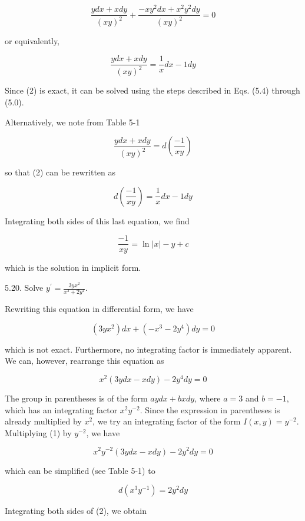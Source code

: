 \documentclass[10pt]{article}
\begin{document}
$$
\frac{y d x+x d y}{(x y)^{2}}+\frac{-x y^{2} d x+x^{2} y^{2} d y}{(x y)^{2}}=0
$$

or equivalently,


\begin{equation*}
\frac{y d x+x d y}{(x y)^{2}}=\frac{1}{x} d x-1 d y \tag{2}
\end{equation*}


Since (2) is exact, it can be solved using the steps described in Eqs. (5.4) through (5.0).

Alternatively, we note from Table 5-1

$$
\frac{y d x+x d y}{(x y)^{2}}=d\left(\frac{-1}{x y}\right)
$$

so that (2) can be rewritten as

$$
d\left(\frac{-1}{x y}\right)=\frac{1}{x} d x-1 d y
$$

Integrating both sides of this last equation, we find

$$
\frac{-1}{x y}=\ln |x|-y+c
$$

which is the solution in implicit form.

5.20. Solve $y^{\prime}=\frac{3 y x^{2}}{x^{3}+2 y^{4}}$.

Rewriting this equation in differential form, we have

$$
\left(3 y x^{2}\right) d x+\left(-x^{3}-2 y^{4}\right) d y=0
$$

which is not exact. Furthermore, no integrating factor is immediately apparent. We can, however, rearrange this equation as


\begin{equation*}
x^{2}(3 y d x-x d y)-2 y^{4} d y=0 \tag{1}
\end{equation*}


The group in parentheses is of the form $a y d x+b x d y$, where $a=3$ and $b=-1$, which has an integrating factor $x^{2} y^{-2}$. Since the expression in parentheses is already multiplied by $x^{2}$, we try an integrating factor of the form $I(x, y)=y^{-2}$. Multiplying (1) by $y^{-2}$, we have

$$
x^{2} y^{-2}(3 y d x-x d y)-2 y^{2} d y=0
$$

which can be simplified (see Table 5-1) to


\begin{equation*}
d\left(x^{3} y^{-1}\right)=2 y^{2} d y \tag{2}
\end{equation*}


Integrating both sides of (2), we obtain
\end{document}
